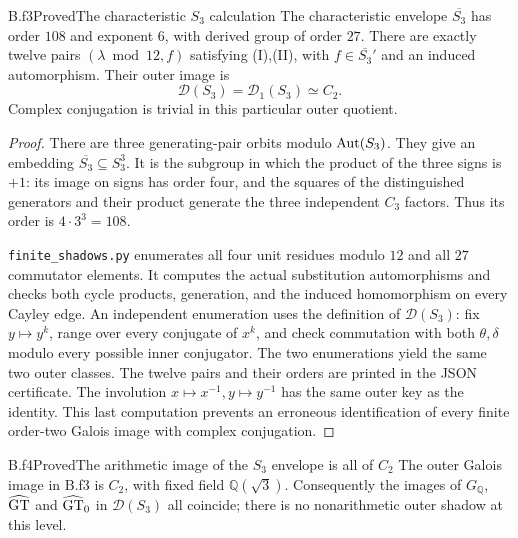 \begin{claim}{B.f3}{Proved}{The characteristic $S_3$ calculation}
The characteristic envelope $\overline{S_3}$ has order $108$ and
exponent $6$, with derived group of order $27$. There are exactly twelve
pairs $(\lambda\bmod12,f)$ satisfying (I),(II), with
$f\in\overline{S_3}'$ and an induced automorphism. Their outer image is
\[
 \mathcal D(S_3)=\mathcal D_1(S_3)\simeq C_2.
\]
Complex conjugation is trivial in this particular outer quotient.
\end{claim}

\begin{proof}
There are three generating-pair orbits modulo $\operatorname{Aut}(S_3)$.
They give an embedding $\overline{S_3}\subseteq S_3^3$.
It is the subgroup in which the product of the three signs is $+1$:
its image on signs has order four, and the squares of the distinguished
generators and their product generate the three independent $C_3$
factors. Thus its order is $4\cdot3^3=108$.

\texttt{finite\_shadows.py} enumerates all four unit residues modulo
$12$ and all $27$ commutator elements. It computes the actual
substitution automorphisms and checks both cycle products, generation,
and the induced homomorphism on every Cayley edge. An independent
enumeration uses the definition of $\mathcal D(S_3)$: fix
$y\mapsto y^k$, range over every conjugate of $x^k$, and check
commutation with both $\theta,\delta$ modulo every possible inner
conjugator. The two enumerations yield the same two outer classes.
The twelve pairs and their orders are printed in the JSON certificate.
The involution $x\mapsto x^{-1},y\mapsto y^{-1}$ has the same outer
key as the identity. This last computation prevents an erroneous
identification of every finite order-two Galois image with complex
conjugation.
\end{proof}

\begin{claim}{B.f4}{Proved}{The arithmetic image of the $S_3$ envelope is all of $C_2$}
The outer Galois image in B.f3 is $C_2$, with fixed field
$\mathbb Q(\sqrt3)$. Consequently the images of $G_\mathbb Q$, $\widehat{\mathrm{GT}}$
and $\widehat{\mathrm{GT}}_0$ in $\mathcal D(S_3)$ all coincide; there is no nonarithmetic
outer shadow at this level.
\end{claim}


